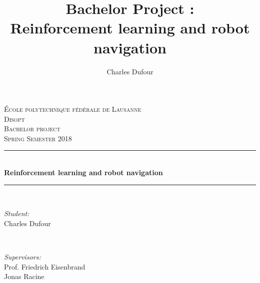 \documentclass[14pt,a4paper]{article}
\author{Charles Dufour}
\title{Bachelor Project : \\
Reinforcement learning and robot navigation}
\theoremstyle{definition}
\begin{document}
\begin{titlepage}
\newcommand{\HRule}{\rule{\linewidth}{0.5mm}} %

\center %
 

\vspace{3cm}
\textsc{\LARGE \'Ecole polytechnique f\'ed\'erale de Lausanne}\\[0.5cm] %
\textsc{\large Disopt}\\[1.5cm] %
\textsc{\LARGE Bachelor project}\\[0.5cm] %
\textsc{\large Spring Semester 2018 }\\[0.5cm] %


\HRule \\[0.4cm]
{ \huge \bfseries Reinforcement learning and robot navigation}\\[0.4cm] %
\HRule \\[1.5cm]
 

\begin{minipage}{0.4\textwidth}
\begin{flushleft} \large
\emph{Student:}\\
Charles Dufour
\end{flushleft}
\end{minipage}
~
\begin{minipage}{0.4\textwidth}
\begin{flushright} \large
\emph{Supervisors:} \\
Prof. Friedrich Eisenbrand \\%
Jonas Racine
\end{flushright}
\end{minipage}\\[5cm]


\end{titlepage}
\end{document}
